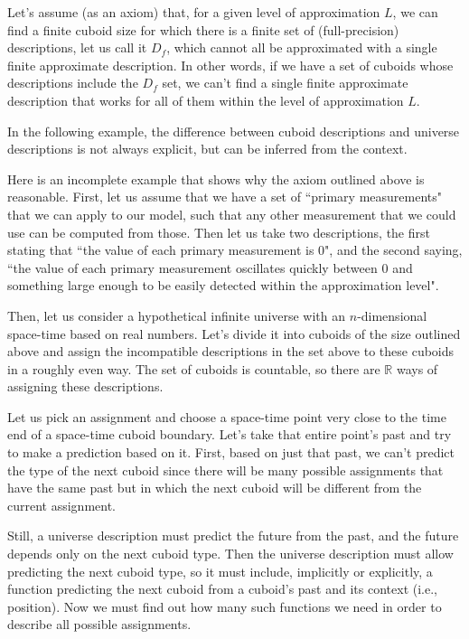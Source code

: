 \documentclass[a4paper
,draft
]{article}
\def\reale{\mathbb{R}}
\newcommand{\ghilimele}[1]{``#1"}
\begin{document}
Let's assume (as an axiom) that, for a given level of approximation $L$, we can
find a finite cuboid size for which there is a finite set of
(full-precision)
descriptions, let us call it $D_f$, which cannot all be approximated with a
single finite approximate description.
In other words, if we have a set of cuboids whose descriptions include
the $D_f$ set, we can't
find a single finite approximate description that works for all of them
within the level of approximation $L$.

In the following example, the difference between
cuboid descriptions and universe descriptions is not always explicit,
but can be inferred from the context.

Here is an incomplete example that shows why the axiom outlined above is reasonable.
First, let us assume that we have a set of
\ghilimele{primary measurements} that we
can apply to our model, such that any other measurement that we could use can be
computed from those.
Then let us take two descriptions, the first stating that
\ghilimele{the value of each primary measurement is $0$},
and the second saying,
\ghilimele{the value of each primary measurement oscillates quickly
  between $0$ and something large enough to be easily detected within
  the approximation level}.

Then, let us consider a hypothetical infinite universe with an $n$-dimensional
space-time based on real numbers.
Let's divide it into cuboids of the size outlined above
and assign the incompatible
descriptions in the set above to these cuboids in a roughly even
way.
The set of cuboids is countable, so there are $\reale$ ways of
assigning these descriptions.

Let us pick an assignment and choose a space-time point very close to the
time end of a space-time cuboid boundary.
Let's take that entire point's past and try to make a prediction based
on it.
First, based on just that past, we can't predict the type of the next cuboid
since there will be many possible assignments that have the same past but in
which the next cuboid will be different from the current assignment.

Still, a universe description must predict the future from the past, and
the future depends only on the next cuboid type. Then the universe
description must allow predicting the next cuboid type, so it must include,
implicitly or explicitly,
a function predicting the next cuboid from a cuboid's past
and its context (i.e., position). Now we must find out how many such functions
we need in order to describe all possible assignments.
\end{document}
